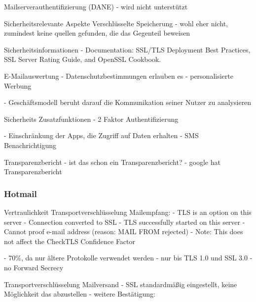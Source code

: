 \documentclass  [paper=a4,
				fontsize=12pt,
				listof=totoc,
				bibliography=totoc
				]{scrreprt}
\begin{document}
			Mailserverauthentifizierung (DANE)
			- wird nicht unterstützt
			
			Sicherheitsrelevante Aspekte
			Verschlüsselte Speicherung
			- wohl eher nicht, zumindest keine quellen gefunden, die das Gegenteil beweisen
	
			
			Sicherheitsinformationen
			- Documentation: SSL/TLS Deployment Best Practices, SSL Server Rating Guide, and OpenSSL Cookbook. 
			
			E-Mailauswertung
			- Datenschutzbestimmungen erlauben es
			- personalisierte Werbung
			
			- Geschäftsmodell beruht darauf die Kommunikation seiner Nutzer zu analysieren
			
			Sicherheits Zusatzfunktionen
			- 2 Faktor Authentifizierung
		
			- Einschränkung der Apps, die Zugriff  auf Daten erhalten
			- SMS Benachrichtigung
			
			Transparenzbericht
			- ist das schon ein Transparenzbericht?
			- google hat Transparenzbericht
			
			
			
			\subsubsection*{Hotmail}
			\label{subsubsec:hotmail}
			
			Vertraulichkeit
			Transportverschlüsselung Mailempfang:
			-  	TLS is an option on this server
			-  	Connection converted to SSL
			- 	TLS successfully started on this server
			- 	Cannot proof e-mail address (reason: MAIL FROM rejected)
			- Note: This does not affect the CheckTLS Confidence Factor
			
			- 70\%, da nur ältere Protokolle verwendet werden
			- nur bis TLS 1.0 und SSL 3.0
			- no Forward Secrecy
			
			Transportverschlüsselung Mailversand
			- SSL standardmäßig eingestellt, keine Möglichkeit das abzustellen
			- weitere Bestätigung:
			
\end{document}
